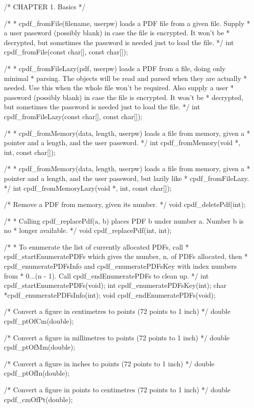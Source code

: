 /* CHAPTER 1. Basics */

/*
 * cpdf_fromFile(filename, userpw) loads a PDF file from a given file. Supply
 * a user password (possibly blank) in case the file is encrypted. It won't be
 * decrypted, but sometimes the password is needed just to load the file.
 */
int cpdf_fromFile(const char[], const char[]);

/*
 * cpdf_fromFileLazy(pdf, userpw) loads a PDF from a file, doing only minimal
 * parsing. The objects will be read and parsed when they are actually
 * needed. Use this when the whole file won't be required. Also supply a user
 * password (possibly blank) in case the file is encrypted. It won't be
 * decrypted, but sometimes the password is needed just to load the file.
 */
int cpdf_fromFileLazy(const char[], const char[]);

/*
 * cpdf_fromMemory(data, length, userpw) loads a file from memory, given a
 * pointer and a length, and the user password.
 */
int cpdf_fromMemory(void *, int, const char[]);

/*
 * cpdf_fromMemory(data, length, userpw) loads a file from memory, given a
 * pointer and a length, and the user password, but lazily like
 * cpdf_fromFileLazy.
 */
int cpdf_fromMemoryLazy(void *, int, const char[]);

/* Remove a PDF from memory, given its number. */
void cpdf_deletePdf(int);

/*
 * Calling cpdf_replacePdf(a, b) places PDF b under number a. Number b is no
 * longer available.
 */
void cpdf_replacePdf(int, int);

/*
 * To enumerate the list of currently allocated PDFs, call
 * cpdf_startEnumeratePDFs which gives the number, n, of PDFs allocated, then
 * cpdf_enumeratePDFsInfo and cpdf_enumeratePDFsKey with index numbers from
 * 0...(n - 1). Call cpdf_endEnumeratePDFs to clean up.
 */
int cpdf_startEnumeratePDFs(void);
int cpdf_enumeratePDFsKey(int);
char *cpdf_enumeratePDFsInfo(int);
void cpdf_endEnumeratePDFs(void);

/* Convert a figure in centimetres to points (72 points to 1 inch) */
double cpdf_ptOfCm(double);

/* Convert a figure in millimetres to points (72 points to 1 inch) */
double cpdf_ptOfMm(double);

/* Convert a figure in inches to points (72 points to 1 inch) */
double cpdf_ptOfIn(double);

/* Convert a figure in points to centimetres (72 points to 1 inch) */
double cpdf_cmOfPt(double);

